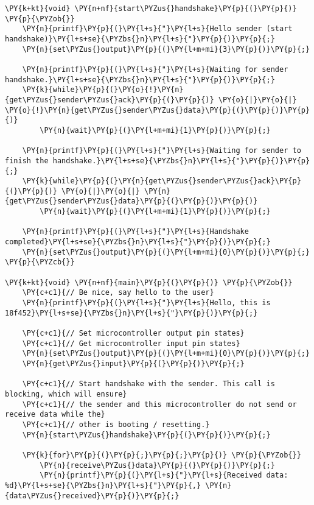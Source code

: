 \begin{Verbatim}[commandchars=\\\{\}]
\PY{k+kt}{void} \PY{n+nf}{start\PYZus{}handshake}\PY{p}{(}\PY{p}{)} \PY{p}{\PYZob{}}
    \PY{n}{printf}\PY{p}{(}\PY{l+s}{"}\PY{l+s}{Hello sender (start handshake)}\PY{l+s+se}{\PYZbs{}n}\PY{l+s}{"}\PY{p}{)}\PY{p}{;}
    \PY{n}{set\PYZus{}output}\PY{p}{(}\PY{l+m+mi}{3}\PY{p}{)}\PY{p}{;}

    \PY{n}{printf}\PY{p}{(}\PY{l+s}{"}\PY{l+s}{Waiting for sender handshake.}\PY{l+s+se}{\PYZbs{}n}\PY{l+s}{"}\PY{p}{)}\PY{p}{;}
    \PY{k}{while}\PY{p}{(}\PY{o}{!}\PY{n}{get\PYZus{}sender\PYZus{}ack}\PY{p}{(}\PY{p}{)} \PY{o}{|}\PY{o}{|} \PY{o}{!}\PY{n}{get\PYZus{}sender\PYZus{}data}\PY{p}{(}\PY{p}{)}\PY{p}{)}
        \PY{n}{wait}\PY{p}{(}\PY{l+m+mi}{1}\PY{p}{)}\PY{p}{;}

    \PY{n}{printf}\PY{p}{(}\PY{l+s}{"}\PY{l+s}{Waiting for sender to finish the handshake.}\PY{l+s+se}{\PYZbs{}n}\PY{l+s}{"}\PY{p}{)}\PY{p}{;}
    \PY{k}{while}\PY{p}{(}\PY{n}{get\PYZus{}sender\PYZus{}ack}\PY{p}{(}\PY{p}{)} \PY{o}{|}\PY{o}{|} \PY{n}{get\PYZus{}sender\PYZus{}data}\PY{p}{(}\PY{p}{)}\PY{p}{)}
        \PY{n}{wait}\PY{p}{(}\PY{l+m+mi}{1}\PY{p}{)}\PY{p}{;}

    \PY{n}{printf}\PY{p}{(}\PY{l+s}{"}\PY{l+s}{Handshake completed}\PY{l+s+se}{\PYZbs{}n}\PY{l+s}{"}\PY{p}{)}\PY{p}{;}
    \PY{n}{set\PYZus{}output}\PY{p}{(}\PY{l+m+mi}{0}\PY{p}{)}\PY{p}{;}
\PY{p}{\PYZcb{}}

\PY{k+kt}{void} \PY{n+nf}{main}\PY{p}{(}\PY{p}{)} \PY{p}{\PYZob{}}
    \PY{c+c1}{// Be nice, say hello to the user}
    \PY{n}{printf}\PY{p}{(}\PY{l+s}{"}\PY{l+s}{Hello, this is 18f452}\PY{l+s+se}{\PYZbs{}n}\PY{l+s}{"}\PY{p}{)}\PY{p}{;}

    \PY{c+c1}{// Set microcontroller output pin states}
    \PY{c+c1}{// Get microcontroller input pin states}
    \PY{n}{set\PYZus{}output}\PY{p}{(}\PY{l+m+mi}{0}\PY{p}{)}\PY{p}{;}
    \PY{n}{get\PYZus{}input}\PY{p}{(}\PY{p}{)}\PY{p}{;}

    \PY{c+c1}{// Start handshake with the sender. This call is blocking, which will ensure}
    \PY{c+c1}{// the sender and this microcontroller do not send or receive data while the}
    \PY{c+c1}{// other is booting / resetting.}
    \PY{n}{start\PYZus{}handshake}\PY{p}{(}\PY{p}{)}\PY{p}{;}

    \PY{k}{for}\PY{p}{(}\PY{p}{;}\PY{p}{;}\PY{p}{)} \PY{p}{\PYZob{}}
        \PY{n}{receive\PYZus{}data}\PY{p}{(}\PY{p}{)}\PY{p}{;}
        \PY{n}{printf}\PY{p}{(}\PY{l+s}{"}\PY{l+s}{Received data: %d}\PY{l+s+se}{\PYZbs{}n}\PY{l+s}{"}\PY{p}{,} \PY{n}{data\PYZus{}received}\PY{p}{)}\PY{p}{;}


\end{Verbatim}
